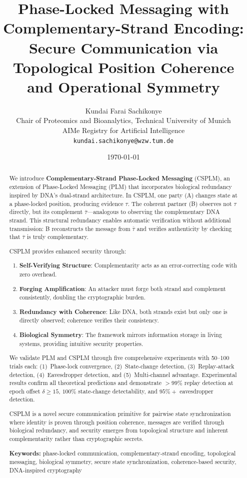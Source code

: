 \documentclass[twocolumn,10pt,a4paper]{article}
\title{\textbf{Phase-Locked Messaging with Complementary-Strand Encoding: \\ Secure Communication via Topological Position Coherence and Operational Symmetry}}
\author{Kundai Farai Sachikonye\\
\small Chair of Proteomics and Bioanalytics, Technical University of Munich\\
\small AIMe Registry for Artificial Intelligence\\
\small \texttt{kundai.sachikonye@wzw.tum.de}}
\date{\today}
\theoremstyle{plain}
\theoremstyle{definition}
\newcommand{\comp}[1]{\overline{#1}}
\providecommand{\keywords}[1]{\par\medskip\noindent\textbf{Keywords:} #1}
\begin{document}
\maketitle

\begin{abstract}
We introduce \textbf{Complementary-Strand Phase-Locked Messaging} (CSPLM), an extension of Phase-Locked Messaging (PLM) that incorporates biological redundancy inspired by DNA's dual-strand architecture. In CSPLM, one party (A) changes state at a phase-locked position, producing evidence $\tau$. The coherent partner (B) observes not $\tau$ directly, but its complement $\comp{\tau}$---analogous to observing the complementary DNA strand. This structural redundancy enables automatic verification without additional transmission: B reconstructs the message from $\comp{\tau}$ and verifies authenticity by checking that $\comp{\tau}$ is truly complementary.

CSPLM provides enhanced security through:
\begin{enumerate}
\item \textbf{Self-Verifying Structure}: Complementarity acts as an error-correcting code with zero overhead.
\item \textbf{Forging Amplification}: An attacker must forge both strand and complement consistently, doubling the cryptographic burden.
\item \textbf{Redundancy with Coherence}: Like DNA, both strands exist but only one is directly observed; coherence verifies their consistency.
\item \textbf{Biological Symmetry}: The framework mirrors information storage in living systems, providing intuitive security properties.
\end{enumerate}

We validate PLM and CSPLM through five comprehensive experiments with 50--100 trials each: (1)~Phase-lock convergence, (2)~State-change detection, (3)~Replay-attack detection, (4)~Eavesdropper detection, and (5)~Multi-channel advantage. Experimental results confirm all theoretical predictions and demonstrate $>99\%$ replay detection at epoch offset $\delta \geq 15$, $100\%$ state-change detectability, and $95\%+$ eavesdropper detection.

CSPLM is a novel secure communication primitive for pairwise state synchronization where identity is proven through position coherence, messages are verified through biological redundancy, and security emerges from topological structure and inherent complementarity rather than cryptographic secrets.

\keywords{phase-locked communication, complementary-strand encoding, topological messaging, biological symmetry, secure state synchronization, coherence-based security, DNA-inspired cryptography}
\end{abstract}
\end{document}
